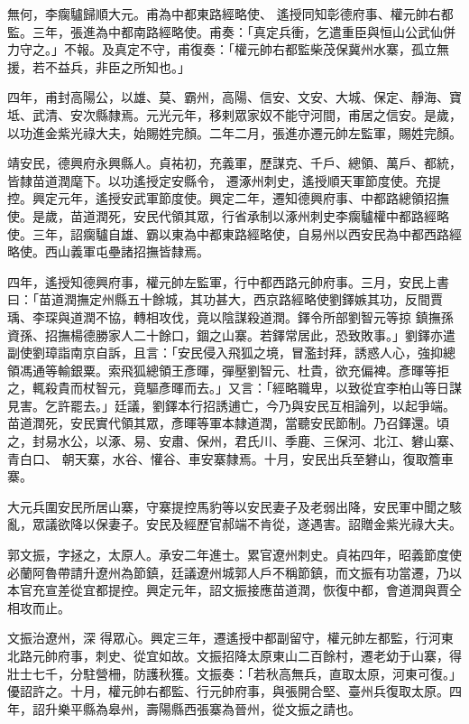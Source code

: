 \begin{pinyinscope}
 無何，李瘸驢歸順大元。甫為中都東路經略使、
 遙授同知彰德府事、權元帥右都監。三年，張進為中都南路經略使。甫奏：「真定兵衝，乞遣重臣與恒山公武仙併力守之。」不報。及真定不守，甫復奏：「權元帥右都監柴茂保冀州水寨，孤立無援，若不益兵，非臣之所知也。」



 四年，甫封高陽公，以雄、莫、霸州，高陽、信安、文安、大城、保定、靜海、寶坻、武清、安次縣隸焉。元光元年，移剌眾家奴不能守河間，甫居之信安。是歲，以功進金紫光祿大夫，始賜姓完顏。二年二月，張進亦遷元帥左監軍，賜姓完顏。



 靖安民，德興府永興縣人。貞祐初，充義軍，歷謀克、千戶、總領、萬戶、都統，皆隸苗道潤麾下。以功遙授定安縣令，
 遷涿州刺史，遙授順天軍節度使。充提控。興定元年，遙授安武軍節度使。興定二年，遷知德興府事、中都路總領招撫使。是歲，苗道潤死，安民代領其眾，行省承制以涿州刺史李瘸驢權中都路經略使。三年，詔瘸驢自雄、霸以東為中都東路經略使，自易州以西安民為中都西路經略使。西山義軍屯壘諸招撫皆隸焉。



 四年，遙授知德興府事，權元帥左監軍，行中都西路元帥府事。三月，安民上書曰：「苗道潤撫定州縣五十餘城，其功甚大，西京路經略使劉鐸嫉其功，反間賈瑀、李琛與道潤不協，轉相攻伐，竟以陰謀殺道潤。鐸令所部劉智元等掠
 鎮撫孫資孫、招撫楊德勝家人二十餘口，錮之山寨。若鐸常居此，恐致敗事。」劉鐸亦遣副使劉璋詣南京自訴，且言：「安民侵入飛狐之境，冒濫封拜，誘惑人心，強抑總領馮通等輸銀粟。索飛狐總領王彥暉，彈壓劉智元、杜貴，欲充偏裨。彥暉等拒之，輒殺貴而杖智元，竟驅彥暉而去。」又言：「經略職卑，以致從宜李柏山等日謀見害。乞許罷去。」廷議，劉鐸本行招誘逋亡，今乃與安民互相論列，以起爭端。苗道潤死，安民實代領其眾，彥暉等軍本隸道潤，當聽安民節制。乃召鐸還。頃之，封易水公，以涿、易、安肅、保州，君氏川、季鹿、三保河、北江、礬山寨、青白口、
 朝天寨，水谷、懽谷、車安寨隸焉。十月，安民出兵至礬山，復取簷車寨。



 大元兵圍安民所居山寨，守寨提控馬豹等以安民妻子及老弱出降，安民軍中聞之駭亂，眾議欲降以保妻子。安民及經歷官郝端不肯從，遂遇害。詔贈金紫光祿大夫。



 郭文振，字拯之，太原人。承安二年進士。累官遼州刺史。貞祐四年，昭義節度使必蘭阿魯帶請升遼州為節鎮，廷議遼州城郭人戶不稱節鎮，而文振有功當遷，乃以本官充宣差從宜都提控。興定元年，詔文振接應苗道潤，恢復中都，會道潤與賈仝相攻而止。



 文振治遼州，深
 得眾心。興定三年，遷遙授中都副留守，權元帥左都監，行河東北路元帥府事，刺史、從宜如故。文振招降太原東山二百餘村，遷老幼于山寨，得壯士七千，分駐營柵，防護秋獲。文振奏：「若秋高無兵，直取太原，河東可復。」優詔許之。十月，權元帥右都監、行元帥府事，與張開合堅、臺州兵復取太原。四年，詔升樂平縣為皋州，壽陽縣西張寨為晉州，從文振之請也。




\end{pinyinscope}
